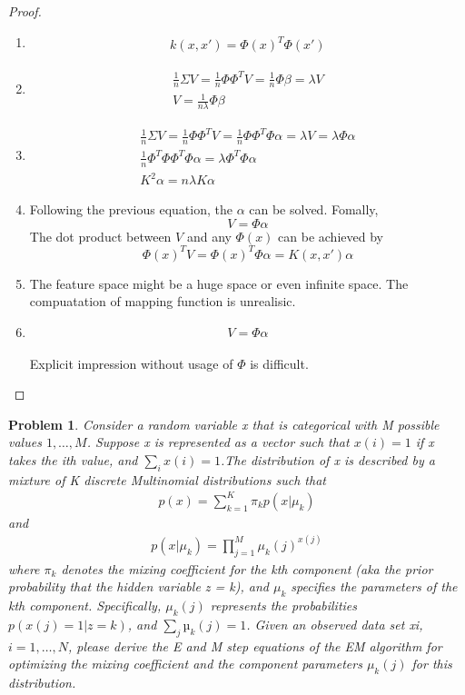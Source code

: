 \documentclass[12pt]{article}
\newtheorem{hw}{Problem}
\begin{document}
\begin{proof}
\begin{enumerate}[label=(\alph*)]
\item
\begin{align*}
	k(x, x') = \Phi(x)^T\Phi(x')
\end{align*}
\item
\begin{align*}
	\frac{1}{n} \Sigma V = \frac{1}{n} \Phi \Phi^T V = \frac{1}{n} \Phi \beta = \lambda V \\
	V = \frac{1}{n \lambda} \Phi \beta
\end{align*}
\item
\begin{align*}
	\frac{1}{n} \Sigma V = \frac{1}{n} \Phi \Phi^T V = \frac{1}{n} \Phi \Phi^T \Phi \alpha = \lambda V = \lambda \Phi \alpha\\
	\frac{1}{n} \Phi^T \Phi \Phi^T \Phi \alpha = \lambda \Phi^T \Phi \alpha \\
	K^2 \alpha = n \lambda K \alpha
\end{align*}
\item
Following the previous equation, the $\alpha$ can be solved. Fomally,
$$V = \Phi \alpha$$
The dot product between $V$ and any $\Phi(x)$ can be achieved by 
$$\Phi(x)^T V = \Phi(x)^T \Phi \alpha = K(x, x') \alpha$$
\item
The feature space might be a huge space or even infinite space. The compuatation of mapping function is unrealisic. 
\item
$$V = \Phi \alpha$$\\
Explicit impression without usage of $\Phi$ is difficult.

\end{enumerate}
\end{proof}

\begin{hw}\rm
Consider a random variable x that is categorical with M possible values $1, \dots, M$. Suppose x is represented as a vector such that $x(i) = 1$ if x takes the ith value, and $\sum_i x(i) = 1$.The distribution of x is described by a mixture of K discrete Multinomial distributions such that
\begin{align*}
	p(x) = \sum_{k=1}^K \pi_k p(x|\mu_k)
\end{align*}
and
\begin{align*}
	 p(x|\mu_k) = \prod_{j=1}^M\mu_k(j)^{x(j)}
\end{align*}
where $\pi_k$ denotes the mixing coefficient for the kth component (aka the prior probability that the hidden variable z = k), and $\mu_k$ specifies the parameters of the kth component. Specifically, $\mu_k(j)$ represents the probabilities $p(x(j) = 1|z = k)$, and $\sum_j µ_k(j) = 1$. Given an observed
data set {xi}, $i = 1, \dots , N$, please derive the E and M step equations of the EM algorithm for optimizing the mixing coefficient and the component parameters $\mu_k(j)$ for this distribution.
\end{hw}
\end{document}
